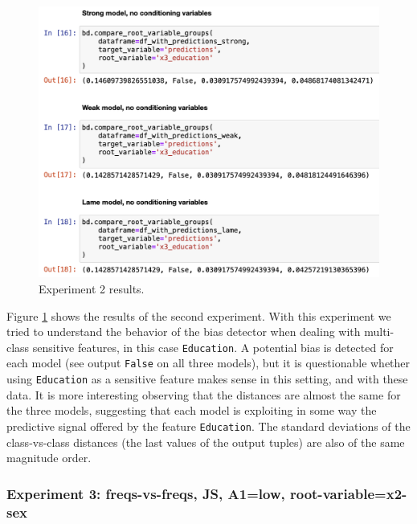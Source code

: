 \documentclass[
]{ceurart}
\begin{document}
\begin{figure}[h!]
  \includegraphics[width=.8\linewidth, left]{exp2.png}
  \caption{Experiment 2 results.}
  \label{fig:exp2}
\end{figure}
Figure \ref{fig:exp2} shows the results of the second experiment. With this experiment we tried to understand the behavior of the bias detector when dealing with multi-class sensitive features, in this case \texttt{Education}. A potential bias is detected for each model (see output \texttt{False} on all three models), but it is questionable whether using \texttt{Education} as a sensitive feature makes sense in this setting, and with these data. It is more interesting observing that the distances are almost the same for the three models, suggesting that each model is exploiting in some way the predictive signal offered by the feature \texttt{Education}. The standard deviations of the class-vs-class distances (the last values of the output tuples) are also of the same magnitude order.

\subsubsection{Experiment 3: freqs-vs-freqs, JS, A1=low, root-variable=x2-sex}
\end{document}
